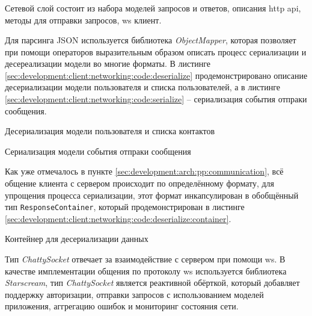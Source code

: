 \subsubsection{}
\label{sec:development:client:networking}

Сетевой слой состоит из набора моделей запросов и ответов, описания \gls{http} \gls{api}, методы для отправки запросов, \gls{ws} клиент.

Для парсинга JSON используется библиотека \textit{ObjectMapper}, которая позволяет при помощи операторов выразительным образом описать процесс сериализации и десереализации модели во многие форматы.
В листинге \ref{sec:development:client:networking:code:deserialize} продемонстрировано описание десериализации модели пользователя и списка пользователей, а в листинге \ref{sec:development:client:networking:code:serialize} -- сериализация события отпраки сообщения.

\begin{code}
	
   \caption{Десериализация модели пользователя и списка контактов}
   \label{sec:development:client:networking:code:deserialize}
\end{code}

\begin{code}
	
   \caption{Сериализация модели события отпраки сообщения}
   \label{sec:development:client:networking:code:serialize}
\end{code}

Как уже отмечалось в пункте \ref{sec:development:arch:pp:communication}, всё общение клиента с сервером происходит по определённому формату, для упрощения процесса сериализации, этот формат инкапсулирован в обобщённый тип \texttt{ResponseContainer}, который продемонстрирован в листинге \ref{sec:development:client:networking:code:deserialize:container}.

\begin{code}
	
   \caption{Контейнер для десериализации данных}
   \label{sec:development:client:networking:code:deserialize:container}
\end{code}

Тип \textit{ChattySocket} отвечает за взаимодействие с сервером при помощи \gls{ws}. В качестве имплементации общения по протоколу \gls{ws} используется библиотека \textit{Starscream}, тип \textit{ChattySocket} является реактивной обёрткой, который добавляет поддержку авторизации, отправки запросов с использованием моделей приложения, аггрегацию ошибок и мониторинг состояния сети.

